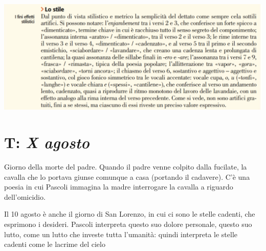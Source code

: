 \documentclass[a4paper, twoside, titlepage]{book}
\begin{document}
\begin{center}
\includegraphics[width=\textwidth]{lavandare2}
\end{center}

\section{T: \textit{X agosto}}

Giorno della morte del padre.
Quando il padre venne colpito dalla fucilate, la cavalla che lo portava giunse comunque a casa (portando il cadavere).
C’è una poesia in cui Pascoli immagina la madre interrogare la cavalla a riguardo dell’omicidio.

Il 10 agosto è anche il giorno di San Lorenzo, in cui ci sono le stelle cadenti, che esprimono i desideri.
Pascoli interpreta questo suo dolore personale, questo suo lutto, come un lutto che investe tutta l’umanità: quindi interpreta le stelle cadenti come le lacrime del cielo
\end{document}
